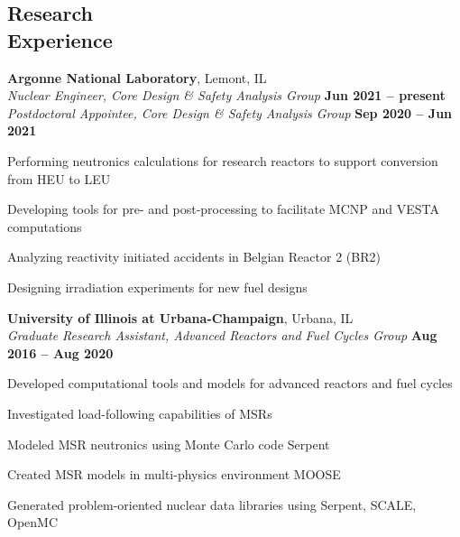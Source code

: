 \documentclass[margin,line]{resume}
\begin{document}
\begin{resume}
    \section{\mysidestyle Research\\Experience}               
    \textbf{Argonne National Laboratory}, Lemont, IL\\
		\textsl{Nuclear Engineer, Core Design \& Safety Analysis Group} 
		\hfill \textbf{Jun 2021 -- present}\\		
		\textsl{Postdoctoral Appointee, Core Design \& Safety Analysis Group} 
		\hfill \textbf{Sep 2020 -- Jun 2021}\\
\vspace{-4mm}\begin{list2}
	\item Performing neutronics calculations for research reactors to 
	support conversion from HEU to LEU
	\item Developing tools for pre- and post-processing 
	to facilitate MCNP and VESTA computations
	\item Analyzing reactivity initiated accidents in Belgian Reactor 2 (BR2)
	\item Designing irradiation experiments for new fuel designs
\end{list2}

    \textbf{University of Illinois at Urbana-Champaign}, Urbana, IL\\
		\textsl{Graduate Research Assistant, Advanced Reactors and Fuel Cycles 
		Group} \hfill \textbf{Aug 2016 -- Aug 2020}\\
                \vspace{-4mm}\begin{list2}
                \item Developed computational tools and models for advanced 
                reactors and fuel cycles
                \item Investigated load-following capabilities of MSRs
                \item Modeled MSR neutronics using Monte Carlo code 
                Serpent
				\item Created MSR models in multi-physics environment MOOSE
				\item Generated problem-oriented nuclear data libraries using 
				Serpent, SCALE, OpenMC
                \end{list2}


\end{resume}
\end{document}
